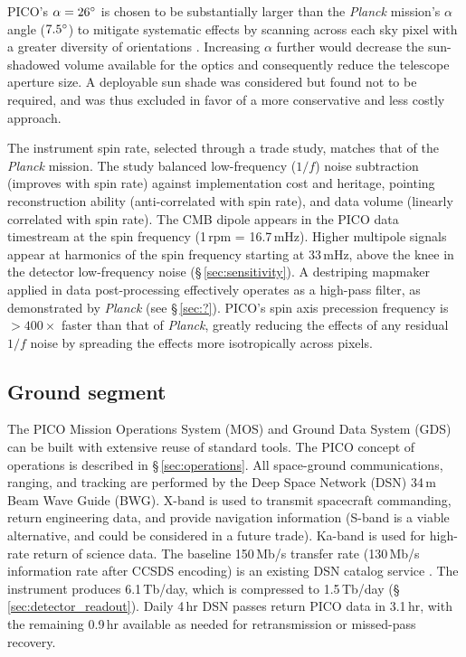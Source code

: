 PICO's $\alpha=26^\circ$ is chosen to be substantially larger than
the \textit{Planck} mission's $\alpha$ angle ($7.5^\circ$) to
mitigate systematic effects by scanning across each sky pixel with a
greater diversity of orientations \citep{Hu2003}. Increasing $\alpha$
further would decrease the sun-shadowed volume available for the
optics and consequently reduce the telescope aperture size. A
deployable sun shade was considered but found not to be required, and
was thus excluded in favor of a more conservative and less costly
approach.

The instrument spin rate, selected through a trade study, matches that
of the \textit{Planck} mission. The study balanced low-frequency
($1/f$) noise subtraction (improves with spin rate) against
implementation cost and heritage, pointing reconstruction ability
(anti-correlated with spin rate), and data volume (linearly correlated
with spin rate).  The CMB dipole appears in the PICO data timestream
at the spin frequency (1\,rpm = 16.7\,mHz). Higher multipole signals
appear at harmonics of the spin frequency starting at 33\,mHz, above
the knee in the detector low-frequency noise
(\S\,\ref{sec:sensitivity}). A destriping mapmaker applied in data
post-processing effectively operates as a high-pass filter, as
demonstrated by \textit{Planck} \citep{Kurki-Suonio2009} (see \S\,\ref{sec:?}). PICO's spin
axis precession frequency is $>400\times$ faster than that of
\textit{Planck}, greatly reducing the effects of any residual $1/f$
noise by spreading the effects more isotropically across pixels.

\subsection{Ground segment}
\label{sec:ground_segment} %

The PICO Mission Operations System (MOS) and Ground Data System (GDS)
can be built with extensive reuse of standard tools. The PICO concept
of operations is described in \S\,\ref{sec:operations}. 
All space-ground communications, ranging, and tracking are performed
by the Deep Space Network (DSN) 34\,m Beam Wave Guide (BWG). X-band is
used to transmit spacecraft commanding, return engineering data, and
provide navigation information (S-band is a viable alternative, and
could be considered in a future trade). Ka-band is used for high-rate
return of science data.  The baseline 150\,Mb/s transfer rate
(130\,Mb/s information rate after CCSDS encoding) is an existing DSN
catalog service \cite{DSN2015}.  The instrument produces 6.1\,Tb/day,
which is compressed to 1.5\,Tb/day
(\S\,\ref{sec:detector_readout}). Daily 4\,hr DSN passes return PICO
data in 3.1\,hr, with the remaining 0.9\,hr available as needed for
retransmission or missed-pass recovery.


